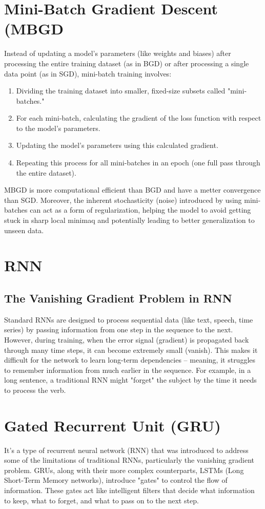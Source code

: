 \section{Mini-Batch Gradient Descent (MBGD}
Instead of updating a model's parameters (like weights and biases)
after processing the entire training dataset (as in BGD) or after
processing a single data point (as in SGD), mini-batch training
involves:
\begin{enumerate}
\item Dividing the training dataset into smaller, fixed-size subsets called "mini-batches."
\item For each mini-batch, calculating the gradient of the loss function with respect to the model's parameters.
\item Updating the model's parameters using this calculated gradient.
\item Repeating this process for all mini-batches in an epoch (one full pass through the entire dataset).
\end{enumerate}
MBGD is more computational efficient than BGD and have a metter convergence than SGD. Moreover, the inherent stochasticity (noise) introduced by using mini-batches can act as a form of regularization, helping the model to avoid getting stuck in sharp local minimaq and potentially leading to better generalization to unseen data.

\section{RNN}

\subsection{The Vanishing Gradient Problem in RNN}
Standard RNNs are designed to process sequential data (like text,
speech, time series) by passing information from one step in the
sequence to the next. However, during training, when the error signal
(gradient) is propagated back through many time steps, it can become
extremely small (vanish). This makes it difficult for the network to
learn long-term dependencies – meaning, it struggles to remember
information from much earlier in the sequence. For example, in a long
sentence, a traditional RNN might "forget" the subject by the time it
needs to process the verb.


\section{Gated Recurrent Unit (GRU)}
It's a type of recurrent neural network (RNN) that was introduced to
address some of the limitations of traditional RNNs, particularly the
vanishing gradient problem. GRUs, along with their more complex
counterparts, LSTMs (Long Short-Term Memory networks), introduce
"gates" to control the flow of information. These gates act like
intelligent filters that decide what information to keep, what to
forget, and what to pass on to the next step.

